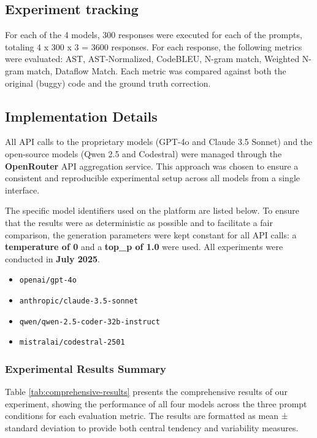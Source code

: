 \subsection{Experiment tracking}
For each of the 4 models, 300 responses were executed for each of the prompts, totaling 4 x 300 x 3 = 3600 responses. For each response, the following metrics were evaluated: AST, AST-Normalized, CodeBLEU, N-gram match, Weighted N-gram match, Dataflow Match.
Each metric was compared against both the original (buggy) code and the ground truth correction.


\subsection{Implementation Details}
\label{sec:implementation-details}

All API calls to the proprietary models (GPT-4o and Claude 3.5 Sonnet) and the open-source models (Qwen 2.5 and Codestral) were managed through the \textbf{OpenRouter} API aggregation service. This approach was chosen to ensure a consistent and reproducible experimental setup across all models from a single interface.

The specific model identifiers used on the platform are listed below. To ensure that the results were as deterministic as possible and to facilitate a fair comparison, the generation parameters were kept constant for all API calls: a \textbf{temperature of 0} and a \textbf{top\_p of 1.0} were used. All experiments were conducted in \textbf{July 2025}.

\begin{itemize}
    \item \texttt{openai/gpt-4o}
    \item \texttt{anthropic/claude-3.5-sonnet}
    \item \texttt{qwen/qwen-2.5-coder-32b-instruct} 
    \item \texttt{mistralai/codestral-2501}
\end{itemize}

\subsubsection{Experimental Results Summary}
Table \ref{tab:comprehensive-results} presents the comprehensive results of our experiment, showing the performance of all four models across the three prompt conditions for each evaluation metric. The results are formatted as mean ± standard deviation to provide both central tendency and variability measures.

